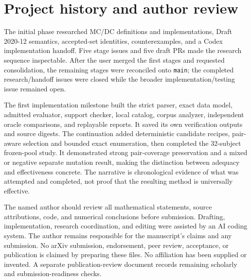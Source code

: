 \documentclass[sigconf,nonacm]{acmart}
\begin{document}
\section{Project history and author review}
The initial phase researched MC/DC definitions and implementations, Draft 2020-12 semantics, accepted-set identities, counterexamples, and a Codex implementation handoff. Five stage issues and five draft PRs made the research sequence inspectable. After the user merged the first stages and requested consolidation, the remaining stages were reconciled onto \texttt{m\allowbreak{}a\allowbreak{}i\allowbreak{}n}; the completed research/handoff issues were closed while the broader implementation/testing issue remained open.

The first implementation milestone built the strict parser, exact data model, admitted evaluator, support checker, local catalog, corpus analyzer, independent oracle comparisons, and replayable reports. It saved its own verification outputs and source digests. The continuation added deterministic candidate recipes, pair-aware selection and bounded exact enumeration, then completed the 32-subject frozen-pool study. It demonstrated strong pair-coverage preservation and a mixed or negative separate mutation result, making the distinction between adequacy and effectiveness concrete. The narrative is chronological evidence of what was attempted and completed, not proof that the resulting method is universally effective.

The named author should review all mathematical statements, source attributions, code, and numerical conclusions before submission. Drafting, implementation, research coordination, and editing were assisted by an AI coding system. The author remains responsible for the manuscript's claims and any submission. No arXiv submission, endorsement, peer review, acceptance, or publication is claimed by preparing these files. No affiliation has been supplied or invented. A separate publication-review document records remaining scholarly and submission-readiness checks.
\end{document}

